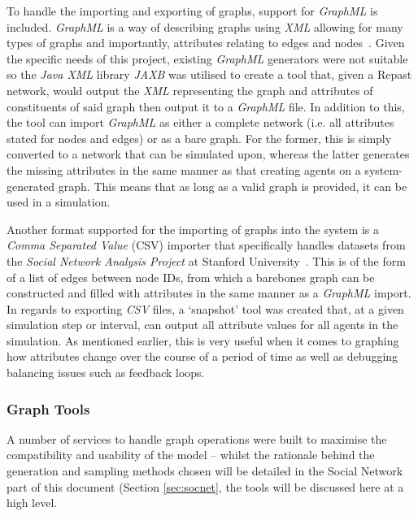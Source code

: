 \documentclass[]{report}
\begin{document}
To handle the importing and exporting of graphs, support for \emph{GraphML} is included. \emph{GraphML} is a way of describing graphs using \emph{XML} allowing for many types of graphs and importantly, attributes relating to edges and nodes~\cite{graphml}. Given the specific needs of this project, existing \emph{GraphML} generators were not suitable so the \emph{Java XML} library \emph{JAXB} was utilised to create a tool that, given a Repast network, would output the \emph{XML} representing the graph and attributes of constituents of said graph then output it to a \emph{GraphML} file. In addition to this, the tool can import \emph{GraphML} as either a complete network (i.e. all attributes stated for nodes and edges) or as a bare graph. For the former, this is simply converted to a network that can be simulated upon, whereas the latter generates the missing attributes in the same manner as that creating agents on a system-generated graph. This means that as long as a valid graph is provided, it can be used in a simulation.

Another format supported for the importing of graphs into the system is a \emph{Comma Separated Value} (CSV) importer that specifically handles datasets from the \emph{Social Network Analysis Project} at Stanford University~\cite{SNAP}. This is of the form of a list of edges between node IDs, from which a barebones graph can be constructed and filled with attributes in the same manner as a \emph{GraphML} import. In regards to exporting \emph{CSV} files, a `snapshot' tool was created that, at a given simulation step or interval, can output all attribute values for all agents in the simulation. As mentioned earlier, this is very useful when it comes to graphing how attributes change over the course of a period of time as well as debugging balancing issues such as feedback loops.

\subsubsection{Graph Tools}
A number of services to handle graph operations were built to maximise the compatibility and usability of the model – whilst the rationale behind the generation and sampling methods chosen will be detailed in the Social Network part of this document (Section \ref{sec:socnet}, the tools will be discussed here at a high level.
\end{document}
